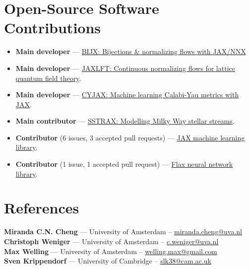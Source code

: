 \documentclass[11pt, letterpaper]{article}
\begin{document}
\section*{Open-Source Software Contributions}
\begin{itemize}[left=0pt, itemsep=3pt]
    \item \textbf{Main developer} — \href{https://github.com/mathisgerdes/bijx}{BIJX: Bijections \& normalizing flows with JAX/NNX}
    \item \textbf{Main developer} — \href{https://github.com/mathisgerdes/continuous-flow-lft}{JAXLFT: Continuous normalizing flows for lattice quantum field theory}.
    \item \textbf{Main developer} — \href{https://github.com/ml4physics/cyjax}{CYJAX: Machine learning Calabi-Yau metrics with JAX}.
    \item \textbf{Main contributor} — \href{https://github.com/undark-lab/sstrax}{SSTRAX: Modelling Milky Way stellar streams}.
    \item \textbf{Contributor} (6 issues, 3 accepted pull requests) — \href{https://github.com/google/jax/issues?q=author:mathisgerdes}{JAX machine learning library}.
    \item \textbf{Contributor} (1 issue, 1 accepted pull request) — \href{https://github.com/google/flax/issues?q=author:mathisgerdes}{Flax neural network library}.
\end{itemize}


\section*{References}
\noindent
\textbf{Miranda C.N. Cheng} — University of Amsterdam -- \href{mailto:c.n.cheng@uva.nl}{miranda.cheng@uva.nl} \\
\textbf{Christoph Weniger} — University of Amsterdam  -- \href{mailto:c.weniger@uva.nl}{c.weniger@uva.nl} \\
\textbf{Max Welling} — University of Amsterdam -- \href{mailto:welling.max@gmail.com}{welling.max@gmail.com} \\
\textbf{Sven Krippendorf} — University of Cambridge -- \href{mailto:slk38@cam.ac.uk}{slk38@cam.ac.uk}
\end{document}
